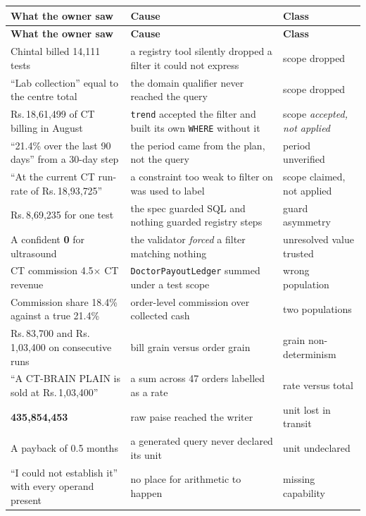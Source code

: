 \documentclass[11pt,a4paper]{report}
\newcommand{\rs}[1]{Rs.\,#1}
\newcommand{\code}[1]{\texttt{\small #1}}
\begin{document}
\begin{center}
\scriptsize
\begin{longtable}{@{}p{5.4cm}p{5.6cm}p{3.2cm}@{}}
\toprule
\textbf{What the owner saw} & \textbf{Cause} & \textbf{Class}\\
\midrule
\endfirsthead
\toprule
\textbf{What the owner saw} & \textbf{Cause} & \textbf{Class}\\
\midrule
\endhead
Chintal billed 14{,}111 tests & a registry tool silently dropped a filter it could not express &
 scope dropped\\
``Lab collection'' equal to the centre total & the domain qualifier never reached the query &
 scope dropped\\
\rs{18{,}61{,}499} of CT billing in August & \code{trend} accepted the filter and built its own
 \code{WHERE} without it & scope \emph{accepted, not applied}\\
``21.4\% over the last 90 days'' from a 30-day step & the period came from the plan, not the query
 & period unverified\\
``At the current CT run-rate of \rs{18{,}93{,}725}'' & a constraint too weak to filter on was used
 to label & scope claimed, not applied\\
\rs{8{,}69{,}235} for one test & the spec guarded SQL and nothing guarded registry steps & guard
 asymmetry\\
A confident \textbf{0} for ultrasound & the validator \emph{forced} a filter matching nothing &
 unresolved value trusted\\
CT commission 4.5$\times$ CT revenue & \code{DoctorPayoutLedger} summed under a test scope & wrong
 population\\
Commission share 18.4\% against a true 21.4\% & order-level commission over collected cash & two
 populations\\
\rs{83{,}700} and \rs{1{,}03{,}400} on consecutive runs & bill grain versus order grain & grain
 non-determinism\\
``A CT-BRAIN PLAIN is sold at \rs{1{,}03{,}400}'' & a sum across 47 orders labelled as a rate &
 rate versus total\\
\textbf{435{,}854{,}453} & raw paise reached the writer & unit lost in transit\\
A payback of 0.5 months & a generated query never declared its unit & unit undeclared\\
``I could not establish it'' with every operand present & no place for arithmetic to happen &
 missing capability\\

\end{longtable}
\end{center}
\end{document}
